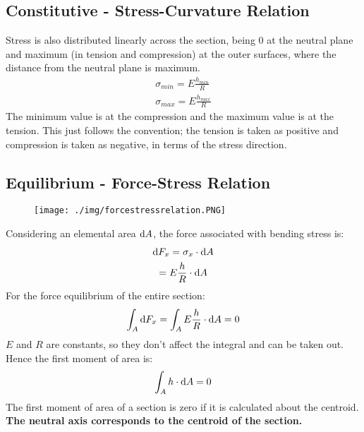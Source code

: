 \subsection{Constitutive - Stress-Curvature Relation}
Stress is also distributed linearly across the section, being 0 at the neutral plane and maximum (in tension and compression) at the outer surfaces, where the distance from the neutral plane is maximum.
\begin{gather}
  \sigma_{min} = E\frac{h_{min}}{R} \\
  \sigma_{max} = E\frac{h_{max}}{R}
\end{gather}
The minimum value is at the compression and the maximum value is at the tension. This just follows the convention; the tension is taken as positive and compression is taken as negative, in terms of the stress direction.
\subsection{Equilibrium - Force-Stress Relation}
\begin{figure}[H]
  \centering
  \texttt{[image: ./img/forcestressrelation.PNG]}
\end{figure}
Considering an elemental area $\dif A$, the force associated with bending stress is:
\begin{gather}
  \dif F_x = \sigma_x \cdot \dif A \\
  = E\frac{h}{R}\cdot \dif A
\end{gather}
For the force equilibrium of the entire section:
\begin{gather}
  \int_{A}\dif F_x = \int_{A} E\frac{h}{R}\cdot \dif A = 0 \\
\end{gather}
$E$ and $R$ are constants, so they don't affect the integral and can be taken out. Hence the first moment of area is:
\begin{gather}
  \int_{A} h\cdot \dif A = 0
\end{gather}
The first moment of area of a section is zero if it is calculated about the centroid. \textbf{The neutral axis corresponds to the centroid of the section.}
